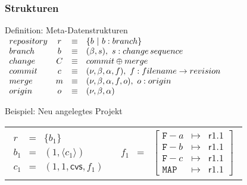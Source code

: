 \documentclass[german]{beamer}
\begin{document}
\begin{frame}
  \frametitle{Strukturen}

  \begin{block}{Definition: Meta-Datenstrukturen}
    \medskip
    $\begin{array}{lccl}
      \mathnormal{repository} & r & \equiv & \{b\ |\ b : \mathnormal{branch}\} \\
      \mathnormal{branch}     & b & \equiv &
      (\beta, s),\ s : \mathnormal{change\,sequence} \\
      \mathnormal{change}     & C & \equiv &
      \mathnormal{commit}\oplus\mathnormal{merge} \\
      \mathnormal{commit}     & c & \equiv &
      (\nu, \beta, \alpha, f),\ f : \mathnormal{filename}\rightarrow
      \mathnormal{revision} \\
      \mathnormal{merge}      & m & \equiv &
      (\nu, \beta, \alpha, f, o),\ o : \mathnormal{origin} \\
      \mathnormal{origin}     & o & \equiv &
      (\nu, \beta, \alpha)      \end{array}$
  \end{block}

  \begin{block}{Beispiel: Neu angelegtes Projekt}
    \medskip
    \begin{tabular}{ll}
      $\begin{array}{lcl}
        r   &=& \{b_1\} \\
        b_1 &=& (1, \langle c_1 \rangle) \\
        c_1 &=& (1, 1, \mathsf{cvs}, f_1)
      \end{array}$ &
      $\begin{array}{lcl}
        f_1 &=& \left[
          \begin{array}{lcl}
            \mathtt{F-}a & \mapsto & \mathsf{r1.1} \\
            \mathtt{F-}b & \mapsto & \mathsf{r1.1} \\
            \mathtt{F-}c & \mapsto & \mathsf{r1.1} \\
            \mathtt{MAP} & \mapsto & \mathsf{r1.1}
          \end{array}
        \right]
      \end{array}$
    \end{tabular}
  \end{block}
\end{frame}
\end{document}
